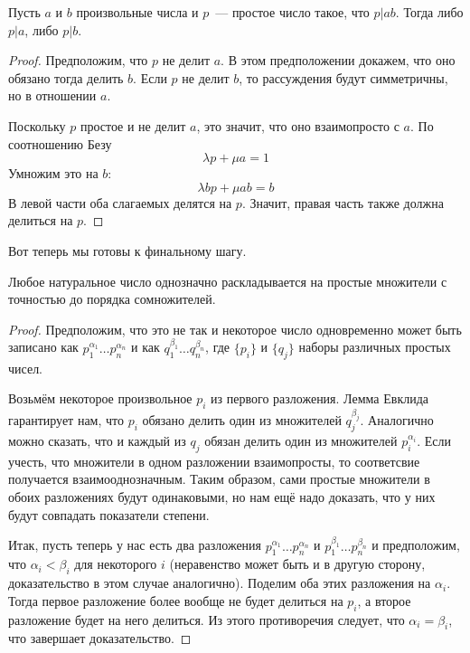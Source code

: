 \begin{EuclidsLemma}
Пусть $a$ и $b$ произвольные числа и $p$~— простое число такое, что $p|ab$. Тогда либо $p|a$, либо $p|b$.
\end{EuclidsLemma}
\begin{proof}
Предположим, что $p$ не делит $a$. В этом предположении докажем, что оно обязано тогда делить $b$. Если $p$ не делит $b$, то рассуждения будут симметричны, но в отношении $a$.

Поскольку $p$ простое и не делит $a$, это значит, что оно взаимопросто с $a$. По соотношению Безу
$$\lambda p + \mu a = 1$$
Умножим это на $b$:
$$ \lambda bp + \mu ab = b$$
В левой части оба слагаемых делятся на $p$. Значит, правая часть также должна делиться на $p$.
\end{proof}

Вот теперь мы готовы к финальному шагу.

\begin{FTA}
Любое натуральное число однозначно раскладывается на простые множители с точностью до порядка сомножителей.
\end{FTA}
\begin{proof}
Предположим, что это не так и некоторое число одновременно может быть записано как $p_1^{\alpha_1}\ldots p_n^{\alpha_n}$ и как $q_1^{\beta_1}\ldots q_n^{\beta_n}$, где $\{p_i\}$ и $\{q_j\}$ наборы различных простых чисел.

Возьмём некоторое произвольное $p_i$ из первого разложения. Лемма Евклида гарантирует нам, что $p_i$ обязано делить один из множителей $q_j^{\beta_j}$. Аналогично можно сказать, что и каждый из $q_j$ обязан делить один из множителей $p_i^{\alpha_i}$. Если учесть, что множители в одном разложении взаимопросты, то соответсвие получается взаимооднозначным. Таким образом, сами простые множители в обоих разложениях будут одинаковыми, но нам ещё надо доказать, что у них будут совпадать показатели степени.

Итак, пусть теперь у нас есть два разложения $p_1^{\alpha_1}\ldots p_n^{\alpha_n}$ и $p_1^{\beta_1}\ldots p_n^{\beta_n}$ и предположим, что $\alpha_i < \beta_i$ для некоторого $i$ (неравенство может быть и в другую сторону, доказательство в этом случае аналогично). Поделим оба этих разложения на $\alpha_i$. Тогда первое разложение более вообще не будет делиться на $p_i$, а второе разложение будет на него делиться. Из этого противоречия следует, что $\alpha_i=\beta_i$, что завершает доказательство.
\end{proof}

